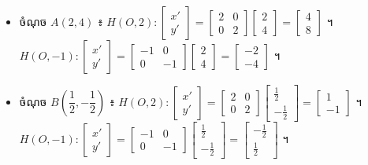 \begin{itemize}
  \item ចំណុច $A(2, 4)$ ៖ $H(O, 2) : \begin{bmatrix} x'\\ y' \end{bmatrix} = \begin{bmatrix} 2 & 0\\ 0 & 2 \end{bmatrix}\begin{bmatrix} 2\\ 4 \end{bmatrix} = \begin{bmatrix} 4\\ 8 \end{bmatrix}$ ។ \ $H(O, -1) : \begin{bmatrix} x'\\ y' \end{bmatrix} = \begin{bmatrix} -1 & 0\\ 0 & -1 \end{bmatrix}\begin{bmatrix} 2\\ 4 \end{bmatrix} = \begin{bmatrix} -2\\ -4 \end{bmatrix}$ ។
  \item ចំណុច $B\left(\dfrac{1}{2}, -\dfrac{1}{2}\right)$ ៖ $H(O, 2) : \begin{bmatrix} x'\\ y' \end{bmatrix} = \begin{bmatrix} 2 & 0\\ 0 & 2 \end{bmatrix}\begin{bmatrix} \frac{1}{2}\\ -\frac{1}{2} \end{bmatrix} = \begin{bmatrix} 1\\ -1 \end{bmatrix}$ ។ \ $H(O, -1) : \begin{bmatrix} x'\\ y' \end{bmatrix} = \begin{bmatrix} -1 & 0\\ 0 & -1 \end{bmatrix}\begin{bmatrix} \frac{1}{2}\\ -\frac{1}{2} \end{bmatrix} = \begin{bmatrix} -\frac{1}{2}\\ \frac{1}{2} \end{bmatrix}$ ។
\end{itemize}

